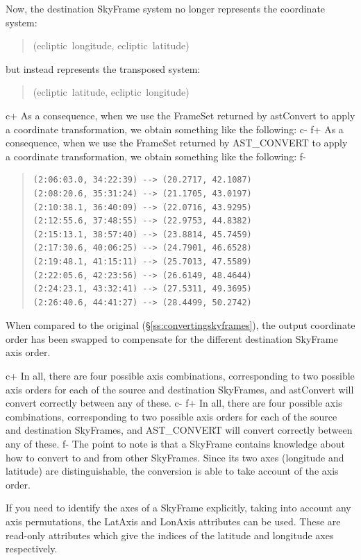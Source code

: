 \documentclass[twoside,11pt]{article}
\newcommand{\secref}[1]{\S\ref{#1}}
\newcommand{\secref}[1]{\ref{#1}}
\begin{document}
Now, the destination SkyFrame system no longer represents the
coordinate system:

\begin{quote}
(ecliptic~longitude, ecliptic~latitude)
\end{quote}

but instead represents the transposed system:

\begin{quote}
(ecliptic~latitude, ecliptic~longitude)
\end{quote}

c+
As a consequence, when we use the FrameSet returned by astConvert to
apply a coordinate transformation, we obtain something like the
following:
c-
f+
As a consequence, when we use the FrameSet returned by AST\_CONVERT to
apply a coordinate transformation, we obtain something like the
following:
f-

\begin{quote}
\begin{verbatim}
(2:06:03.0, 34:22:39) --> (20.2717, 42.1087)
(2:08:20.6, 35:31:24) --> (21.1705, 43.0197)
(2:10:38.1, 36:40:09) --> (22.0716, 43.9295)
(2:12:55.6, 37:48:55) --> (22.9753, 44.8382)
(2:15:13.1, 38:57:40) --> (23.8814, 45.7459)
(2:17:30.6, 40:06:25) --> (24.7901, 46.6528)
(2:19:48.1, 41:15:11) --> (25.7013, 47.5589)
(2:22:05.6, 42:23:56) --> (26.6149, 48.4644)
(2:24:23.1, 43:32:41) --> (27.5311, 49.3695)
(2:26:40.6, 44:41:27) --> (28.4499, 50.2742)
\end{verbatim}
\end{quote}

When compared to the original (\secref{ss:convertingskyframes}), the
output coordinate order has been swapped to compensate for the
different destination SkyFrame axis order.

c+
In all, there are four possible axis combinations, corresponding to two
possible axis orders for each of the source and destination SkyFrames,
and astConvert will convert correctly between any of these.
c-
f+
In all, there are four possible axis combinations, corresponding to two
possible axis orders for each of the source and destination SkyFrames,
and AST\_CONVERT will convert correctly between any of these.
f-
The point to note is that a SkyFrame contains knowledge about how to
convert to and from other SkyFrames. Since its two axes (longitude and
latitude) are distinguishable, the conversion is able to take account
of the axis order.

If you need to identify the axes of a SkyFrame explicitly, taking into
account any axis permutations, the LatAxis and LonAxis attributes can be
used. These are read-only attributes which give the indices of the
latitude and longitude axes respectively.
\end{document}
